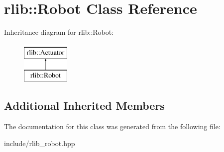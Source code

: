 \hypertarget{classrlib_1_1Robot}{\section{rlib\-:\-:Robot Class Reference}
\label{classrlib_1_1Robot}
}
Inheritance diagram for rlib\-:\-:Robot\-:\begin{figure}[H]
\begin{center}
\leavevmode
\includegraphics[height=2.000000cm]{classrlib_1_1Robot}
\end{center}
\end{figure}
\subsection*{Additional Inherited Members}


The documentation for this class was generated from the following file\-:\begin{DoxyCompactItemize}
\item 
include/rlib\-\_\-robot.\-hpp\end{DoxyCompactItemize}
